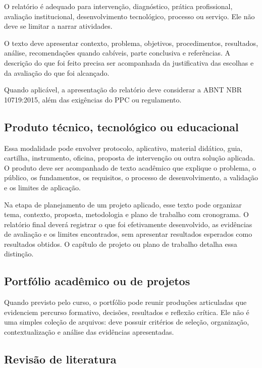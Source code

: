 O relatório é adequado para intervenção, diagnóstico, prática profissional, avaliação institucional, desenvolvimento tecnológico, processo ou serviço. Ele não deve se limitar a narrar atividades.

O texto deve apresentar contexto, problema, objetivos, procedimentos, resultados, análise, recomendações quando cabíveis, parte conclusiva e referências. A descrição do que foi feito precisa ser acompanhada da justificativa das escolhas e da avaliação do que foi alcançado.

Quando aplicável, a apresentação do relatório deve considerar a ABNT NBR 10719:2015, além das exigências do PPC ou regulamento.

\subsection{Produto técnico, tecnológico ou educacional}

Essa modalidade pode envolver protocolo, aplicativo, material didático, guia, cartilha, instrumento, oficina, proposta de intervenção ou outra solução aplicada. O produto deve ser acompanhado de texto acadêmico que explique o problema, o público, os fundamentos, os requisitos, o processo de desenvolvimento, a validação e os limites de aplicação.

Na etapa de planejamento de um projeto aplicado, esse texto pode organizar tema, contexto, proposta, metodologia e plano de trabalho com cronograma. O relatório final deverá registrar o que foi efetivamente desenvolvido, as evidências de avaliação e os limites encontrados, sem apresentar resultados esperados como resultados obtidos. O capítulo de projeto ou plano de trabalho detalha essa distinção.

\subsection{Portfólio acadêmico ou de projetos}

Quando previsto pelo curso, o portfólio pode reunir produções articuladas que evidenciem percurso formativo, decisões, resultados e reflexão crítica. Ele não é uma simples coleção de arquivos: deve possuir critérios de seleção, organização, contextualização e análise das evidências apresentadas.

\subsection{Revisão de literatura}

